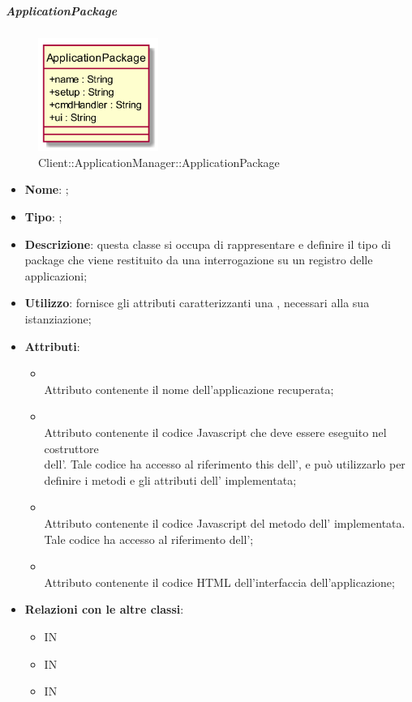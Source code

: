 \hypertarget{ApplicationPackage_label}{\subparagraph{ApplicationPackage}}
\begin{figure}[h]
	\centering
	\includegraphics[width=0.35\textwidth,height=\textheight,keepaspectratio]{images/ClassApplicationPackage.png}
	\caption{Client::ApplicationManager::ApplicationPackage}
\end{figure}
\begin{itemize}
	\item \textbf{Nome}: ;
	\item \textbf{Tipo}: ;
	\item \textbf{Descrizione}: questa classe si occupa di rappresentare e definire il tipo di package che viene restituito da una interrogazione su un registro delle applicazioni;
	\item \textbf{Utilizzo}: fornisce gli attributi caratterizzanti una , necessari alla sua istanziazione;
	\item \textbf{Attributi}:
	\begin{itemize}
		\item[]  \\
		Attributo contenente il nome dell'applicazione recuperata;
		\item[]  \\
		Attributo contenente il codice Javascript che deve essere eseguito nel costruttore \\ dell'. Tale codice ha accesso al riferimento this dell', e può utilizzarlo per definire i metodi e gli attributi dell' implementata;
		\item[]  \\
		Attributo contenente il codice Javascript del metodo  dell' implementata. Tale codice ha accesso al riferimento  dell';
		\item[]  \\
		Attributo contenente il codice HTML dell'interfaccia dell'applicazione;
	\end{itemize}
	\item \textbf{Relazioni con le altre classi}:
	\begin{itemize}
		\item IN \hyperlink{Application_label}{}
		\item IN \hyperlink{<<interface>> ApplicationRegistryClient_label}{}
		\item IN \hyperlink{ApplicationLocalRegistry_label}{}
	\end{itemize}
\end{itemize}
\FloatBarrier

